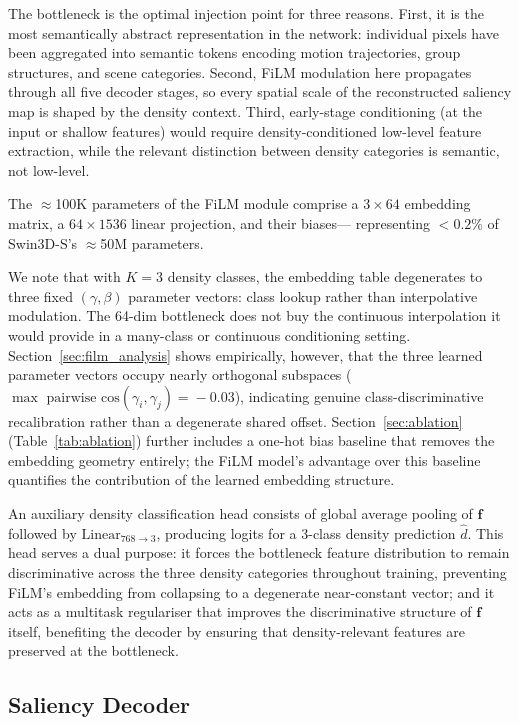 \documentclass[twocolumn]{article}
\begin{document}
The bottleneck is the optimal injection point for three reasons.  First,
it is the most semantically abstract representation in the network:
individual pixels have been aggregated into semantic tokens encoding
motion trajectories, group structures, and scene categories.  Second,
FiLM modulation here propagates through all five decoder stages, so
every spatial scale of the reconstructed saliency map is shaped by the
density context.  Third, early-stage conditioning (at the input or
shallow features) would require density-conditioned low-level feature
extraction, while the relevant distinction between density categories
is semantic, not low-level.

The $\approx$100K parameters of the FiLM module comprise a $3\times64$
embedding matrix, a $64\times1536$ linear projection, and their biases---
representing $<\!0.2$\% of Swin3D-S's $\approx$50M parameters.

We note that with $K\!=\!3$ density classes, the embedding table
degenerates to three fixed $(\gamma,\beta)$ parameter vectors: class
lookup rather than interpolative modulation.  The 64-dim bottleneck does
not buy the continuous interpolation it would provide in a many-class or
continuous conditioning setting.  Section~\ref{sec:film_analysis} shows
empirically, however, that the three learned parameter vectors occupy
nearly orthogonal subspaces ($\max\text{ pairwise cos}(\gamma_i,\gamma_j)
\!=\!-0.03$), indicating genuine class-discriminative recalibration rather
than a degenerate shared offset.  Section~\ref{sec:ablation} (Table~\ref{tab:ablation})
further includes a one-hot bias baseline that removes the embedding
geometry entirely; the FiLM model's advantage over this baseline
quantifies the contribution of the learned embedding structure.

An auxiliary density classification head consists of global average pooling
of $\mathbf{f}$ followed by $\mathrm{Linear}_{768\to3}$, producing
logits for a 3-class density prediction $\hat{d}$.  This head serves a
dual purpose: it forces the bottleneck feature distribution to remain
discriminative across the three density categories throughout training,
preventing FiLM's embedding from collapsing to a degenerate near-constant
vector; and it acts as a multitask regulariser that improves the
discriminative structure of $\mathbf{f}$ itself, benefiting the decoder
by ensuring that density-relevant features are preserved at the
bottleneck.

\subsection{Saliency Decoder}
\end{document}
